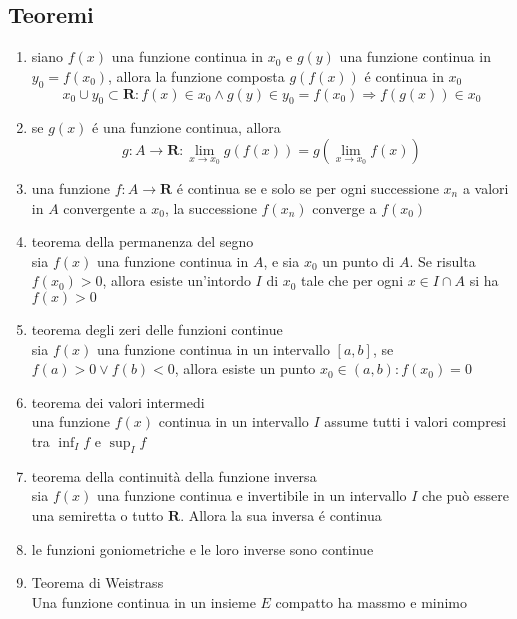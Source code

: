 \documentclass{exam}
\begin{document}
  \subsection{Teoremi}
    \begin{enumerate}
      \item
        siano $f(x)$ una funzione continua in $x_{0}$ e
        $g(y)$ una funzione continua in $y_{0}=f(x_{0})$, allora
        la funzione composta $g(f(x))$ \'e continua in $x_{0}$
        \begin{displaymath}
          x_{0}\cup y_{0}\subset \mathbf{R}:f(x) \in x_{0} \land g(y) 
          \in y_{0}=f(x_{0}) \Rightarrow f(g(x))\in x_{0}
        \end{displaymath}
      \item
        se $g(x)$ \'e una funzione continua, allora
        \begin{displaymath}
          g:A\rightarrow \mathbf{R}:\lim_{x\to x_{0}}g(f(x))=g(\lim_{x\to x_{0}}f(x))
        \end{displaymath}
      \item
        una funzione $f:A\rightarrow \mathbf{R}$ \'e continua se e solo se per ogni successione $x_{n}$ a valori in $A$ convergente a $x_{0}$, la successione $f(x_{n})$ converge a $f(x_{0})$
      \item{teorema della permanenza del segno}\\
        sia $f(x)$ una funzione continua in $A$, e sia $x_{0}$ un punto di $A$. Se risulta $f(x_{0})>0$, allora esiste un'intordo $I$ di $x_{0}$ tale che per ogni $x\in I\cap A$ si ha $f(x)>0$
      \item{teorema degli zeri delle funzioni continue}\\
        sia $f(x)$ una funzione continua in un intervallo $[a,b]$, se $f(a)>0 \lor f(b)<0$, allora esiste un punto $x_{0}\in (a,b):f(x_{0})=0$
      \item{teorema dei valori intermedi}\\
        una funzione $f(x)$ continua in un intervallo $I$ assume tutti i valori compresi tra $\inf_{I}f$ e $\sup_{I}f$
      \item{teorema della continuità della funzione inversa}\\
        sia $f(x)$ una funzione continua e invertibile in un intervallo $I$ che può essere una semiretta o tutto $\mathbf{R}$. Allora la sua inversa \'e continua
      \item le funzioni goniometriche e le loro inverse sono continue
      \item{Teorema di Weistrass}\\
        Una funzione continua in un insieme $E$ compatto ha massmo e minimo
    \end{enumerate}
  \newpage
\end{document}
